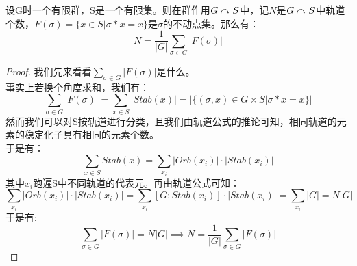 设G时一个有限群，S是一个有限集。则在群作用$G\curvearrowright S$中，记$N$是$G\curvearrowright S$中轨道个数，$F(\sigma)=\{x\in S|\sigma*x=x\}$是$\sigma$的不动点集。那么有：
\[
N=\dfrac{1}{|G|}\sum_{\sigma\in G}|F(\sigma)|
\]
\begin{proof}
我们先来看看$\sum_{\sigma\in G}|F(\sigma)|$是什么。\\
\indent 事实上若换个角度求和，我们有：
\[
\sum_{\sigma\in G}|F(\sigma)|=\sum_{x\in S}|Stab(x)|=|\{(\sigma,x)\in G\times S|\sigma*x=x\}|
\]
然而我们可以对S按轨道进行分类，且我们由轨道公式的推论可知，相同轨道的元素的稳定化子具有相同的元素个数。\\
于是有：
\[
\sum_{x\in S}Stab(x)=\sum_{x_i} |Orb(x_i)|\cdot |Stab(x_i)|
\]
其中$x_i$跑遍S中不同轨道的代表元。再由轨道公式可知：
\[
\sum_{x_i} |Orb(x_i)|\cdot |Stab(x_i)|=\sum_{x_i}[G:Stab(x_i)]\cdot |Stab(x_i)|=\sum_{x_i}|G|=N|G|
\]
于是有:
\[
\sum_{\sigma\in G}|F(\sigma)|=N|G|\implies N=\dfrac{1}{|G|}\sum_{\sigma\in G}|F(\sigma)|
\]
\end{proof}

